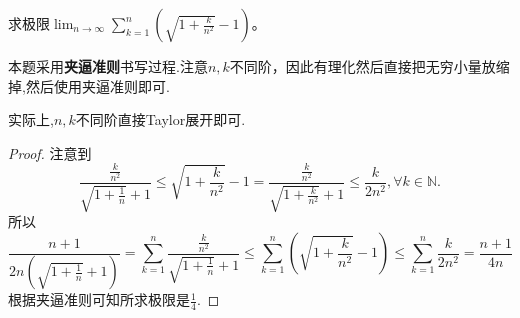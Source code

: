 \documentclass[../../main.tex]{subfiles}%
\begin{document}
\begin{example}\label{example-夹逼准则书写过程示例}
求极限\(\lim_{n\rightarrow\infty}\sum\limits_{k = 1}^{n}\left(\sqrt{1 + \frac{k}{n^{2}}} - 1\right)\)。
\end{example}
\begin{note}
本题采用\textbf{夹逼准则}书写过程.注意\(n,k\)不同阶，因此有理化然后直接把无穷小量放缩掉,然后使用夹逼准则即可.

实际上,$n,k$不同阶直接Taylor展开即可.
\end{note}
\begin{proof}
注意到
\[
\frac{\frac{k}{n^{2}}}{\sqrt{1 + \frac{1}{n}} + 1}\leqslant \sqrt{1 + \frac{k}{n^{2}}} - 1 = \frac{\frac{k}{n^{2}}}{\sqrt{1 + \frac{k}{n^{2}}} + 1}\leqslant \frac{k}{2n^{2}},\forall k\in \mathbb{N}.
\]
所以
\[
\frac{n + 1}{2n\left(\sqrt{1 + \frac{1}{n}} + 1\right)}=\sum\limits_{k = 1}^{n}\frac{\frac{k}{n^{2}}}{\sqrt{1 + \frac{1}{n}} + 1}\leqslant \sum\limits_{k = 1}^{n}\left(\sqrt{1 + \frac{k}{n^{2}}} - 1\right)\leqslant \sum\limits_{k = 1}^{n}\frac{k}{2n^{2}}=\frac{n + 1}{4n}
\]
根据夹逼准则可知所求极限是\(\frac{1}{4}\).
\end{proof}
\end{document}
